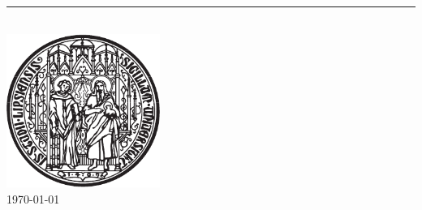 \begin{titlepage}
    \begin{center}
        {\Huge
            \textbf{\documentTitle{}}\\
        }
        \vspace{6pt}
        {\Large
        \textit{\documentSubtitle{}}
        }
        \vspace{12pt}
        \hrule
        \vspace{32pt}
        {
            \Large
            \textbf{\documentAuthor{}}
        }
        \\
        \vspace{32pt}
        \includegraphics[width=5cm]{resources/siegel_schwarz}
        \\
        \vspace{6pt}
        \sffamily{
            \Large
            \university
        }
        \vfill
        \today
    \end{center}
\end{titlepage}
